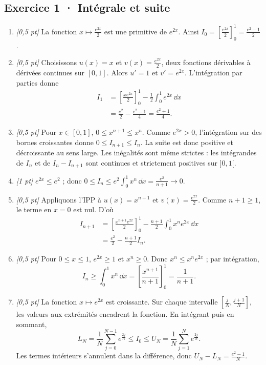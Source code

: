 \subsection*{Exercice 1 · Intégrale et suite}\begin{enumerate}

\item \textit{[0{,}5 pt]} La fonction $x\mapsto \frac{e^{2x}}{2}$ est une primitive de $e^{2x}$. Ainsi $I_0=[\frac{e^{2x}}{2}]_0^1=\frac{e^{2}-1}{2}$.

\item \textit{[0{,}5 pt]} Choisissons $u(x)=x$ et $v(x)=\frac{e^{2x}}{2}$, deux fonctions dérivables à dérivées continues sur $[0,1]$. Alors $u'=1$ et $v'=e^{2x}$. L'intégration par parties donne
\[\begin{aligned}I_1&=\left[\frac{xe^{2x}}{2}\right]_0^1-\frac{1}{2}\int_0^1e^{2x}\,\dd x\\&=\frac{e^{2}}{2}-\frac{e^{2}-1}{4}=\frac{e^{2}+1}{4}.\end{aligned}\]

\item \textit{[0{,}5 pt]} Pour $x\in[0,1]$, $0\le x^{n+1}\le x^n$. Comme $e^{2x}>0$, l'intégration sur des bornes croissantes donne $0\le I_{n+1}\le I_n$. La suite est donc positive et décroissante au sens large. Les inégalités sont même strictes : les intégrandes de $I_n$ et de $I_n-I_{n+1}$ sont continues et strictement positives sur $]0,1[$.

\item \textit{[1 pt]} $e^{2x}\le e^{2}$ ; donc $0\le I_n\le e^{2}\int_0^1x^n\,\dd x=\frac{e^{2}}{n+1}\to0$.

\item \textit{[0{,}5 pt]} Appliquons l'IPP à $u(x)=x^{n+1}$ et $v(x)=\frac{e^{2x}}{2}$. Comme $n+1\ge1$, le terme en $x=0$ est nul. D'où
\[\begin{aligned}I_{n+1}&=\left[\frac{x^{n+1}e^{2x}}{2}\right]_0^1-\frac{n+1}{2}\int_0^1x^ne^{2x}\,\dd x\\&=\frac{e^{2}}{2}-\frac{n+1}{2}I_n.\end{aligned}\]

\item \textit{[0{,}5 pt]} Pour $0\le x\le1$, $e^{2x}\ge1$ et $x^n\ge0$. Donc $x^n\le x^ne^{2x}$ ; par intégration,
\[I_n\ge\int_0^1x^n\,\dd x=\left[\frac{x^{n+1}}{n+1}\right]_0^1=\frac{1}{n+1}.\]

\item \textit{[0{,}5 pt]} La fonction $x\mapsto e^{2x}$ est croissante. Sur chaque intervalle $[\frac{j}{N},\frac{j+1}{N}]$, les valeurs aux extrémités encadrent la fonction. En intégrant puis en sommant,
\[L_N=\frac{1}{N}\sum_{j=0}^{N-1}e^{\frac{2j}{N}}\le I_0\le U_N=\frac{1}{N}\sum_{j=1}^Ne^{\frac{2j}{N}}.\]
Les termes intérieurs s'annulent dans la différence, donc $U_N-L_N=\frac{e^{2}-1}{N}$.


\end{enumerate}
